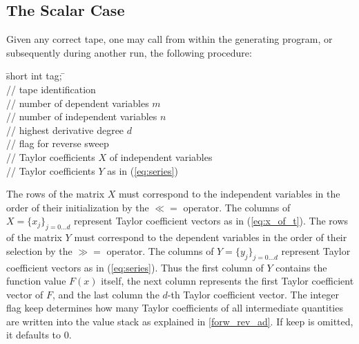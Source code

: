 \documentclass[11pt,twoside]{article}
\begin{document}
\subsection{The Scalar Case}
%
\label{ScaCas}
%     
Given any correct tape, one may call from within
the generating program, or subsequently during another run, the following
procedure:
%
\begin{tabbing}
\hspace{0.5in}\={\sf short int tag;} \hspace{1.1in}\= \kill    %
 \\
         \> // tape identification \\
                 \> // number of dependent variables $m$\\
                 \> // number of independent variables $n$\\
                \> // highest derivative degree $d$\\ 
             \> // flag for reverse sweep \\ 
     \> // Taylor coefficients $X$ of 
                                     independent variables \\
      \> // Taylor coefficients $Y$ as 
                                     in (\ref{eq:series})
\end{tabbing}
%
The rows of the matrix $X$ must correspond to the independent variables in the order of their 
initialization by the \boldmath $\ll=$ \unboldmath operator. The columns of 
$X = \{x_j\}_{j=0\ldots d}$ represent Taylor coefficient vectors as in 
(\ref{eq:x_of_t}). The rows of the matrix $Y$ must
correspond to the
dependent variables in the order of their selection by the \boldmath $\gg=$ \unboldmath operator.
The columns of $Y = \{y_j\}_{j=0\ldots d}$ represent 
Taylor coefficient vectors as in (\ref{eq:series}).
Thus the first column of $Y$ contains the
function value $F(x)$ itself, the next column represents the first
Taylor coefficient vector of $F$, and the last column the 
$d$-th Taylor coefficient vector. The integer flag {\sf keep} determines
how many Taylor coefficients of all intermediate quantities are
written into the value stack as explained in \ref{forw_rev_ad}.
 If {\sf keep} is omitted, it defaults to 0.
\end{document}
